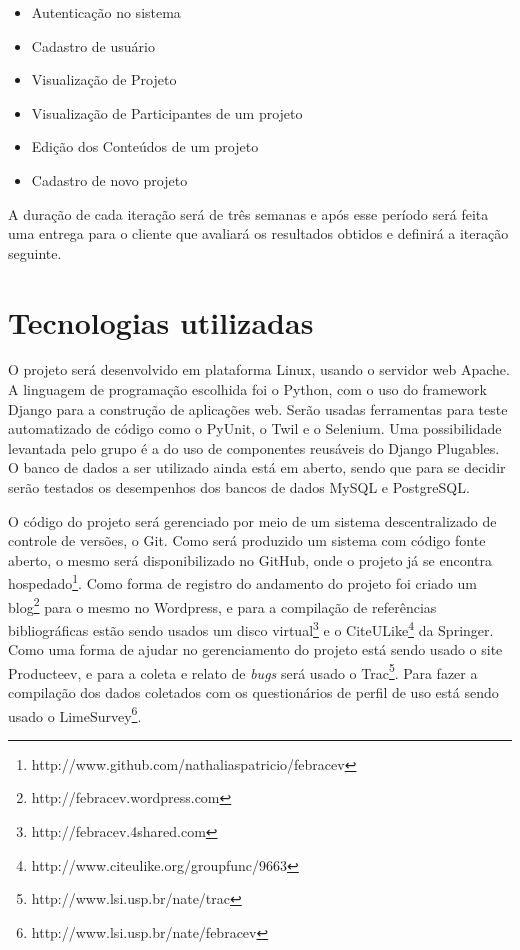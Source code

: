\documentclass[a4paper,12pt,font=plain,header=plain]{abnt}
\begin{document}
  \begin{itemize}
    \item Autenticação no sistema
    \item Cadastro de usuário
    \item Visualização de Projeto
    \item Visualização de Participantes de um projeto
    \item Edição dos Conteúdos de um projeto
    \item Cadastro de novo projeto
  \end{itemize}

	A duração de cada iteração será de três semanas e após esse período será feita uma entrega para o cliente que avaliará os resultados obtidos e definirá a iteração seguinte.

	\chapter{Tecnologias utilizadas}

	O projeto será desenvolvido em plataforma Linux, usando o servidor web Apache. A linguagem de programação escolhida foi o Python, com o uso do framework Django para a construção de aplicações web. Serão usadas ferramentas para teste automatizado de código como o PyUnit, o Twil e o Selenium. Uma possibilidade levantada pelo grupo é a do uso de componentes reusáveis do Django Plugables. O banco de dados a ser utilizado ainda está em aberto, sendo que para se decidir serão testados os desempenhos dos bancos de dados MySQL e PostgreSQL.

	O código do projeto será gerenciado por meio de um sistema descentralizado de controle de versões, o Git. Como será produzido um sistema com código fonte aberto, o mesmo será disponibilizado no GitHub, onde o projeto já se encontra hospedado\footnote{http://www.github.com/nathaliaspatricio/febracev}. Como forma de registro do andamento do projeto foi criado um blog\footnote{http://febracev.wordpress.com} para o mesmo no Wordpress, e para a compilação de referências bibliográficas estão sendo usados um disco virtual\footnote{http://febracev.4shared.com} e o CiteULike\footnote{http://www.citeulike.org/groupfunc/9663} da Springer. Como uma forma de ajudar no gerenciamento do projeto está sendo usado o site Producteev, e para a coleta e relato de \textit{bugs} será usado o Trac\footnote{http://www.lsi.usp.br/nate/trac}. Para fazer a compilação dos dados coletados com os questionários de perfil de uso está sendo usado o LimeSurvey\footnote{http://www.lsi.usp.br/nate/febracev}.
\end{document}
